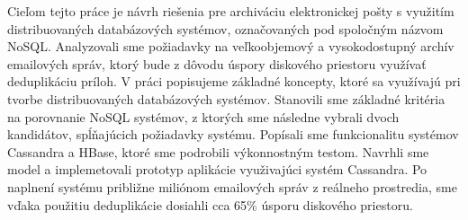 \documentclass[11pt,twoside,a4paper]{book}
\begin{document}
\baselineskip

\noindent
Cieľom tejto práce je návrh riešenia pre archiváciu elektronickej pošty s využitím distribuovaných databázových systémov, označovaných pod spoločným názvom NoSQL. Analyzovali sme požiadavky na veľkoobjemový a vysokodostupný archív emailových správ, ktorý bude z dôvodu úspory diskového priestoru využívať deduplikáciu príloh. V práci popisujeme základné koncepty, ktoré sa využívajú pri tvorbe distribuovaných databázových systémov. Stanovili sme základné kritéria na porovnanie NoSQL systémov, z ktorých sme následne vybrali dvoch kandidátov, spĺňajúcich požiadavky systému. Popísali sme funkcionalitu systémov Cassandra a HBase, ktoré sme podrobili výkonnostným testom. Navrhli sme model a implemetovali prototyp aplikácie využivajúci systém Cassandra. Po naplnení systému približne miliónom emailových správ z reálneho prostredia, sme vďaka použitiu deduplikácie dosiahli cca 65\% úsporu diskového priestoru.





\end{document}
